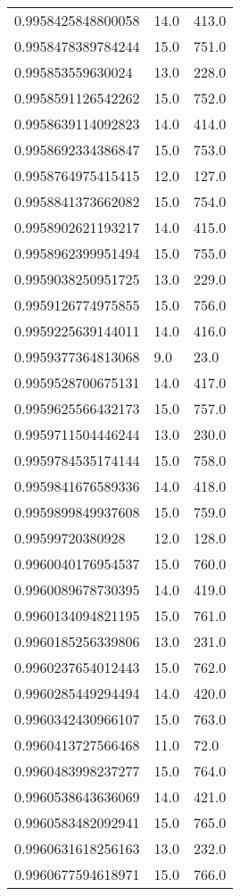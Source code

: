 \begin{center}
\begin{supertabular}[H]{p{0.30\textwidth}p{0.05\textwidth}p{0.05\textwidth}}
0.9958425848800058 & 14.0 & 413.0 \\ 
0.9958478389784244 & 15.0 & 751.0 \\ 
0.995853559630024 & 13.0 & 228.0 \\ 
0.9958591126542262 & 15.0 & 752.0 \\ 
0.9958639114092823 & 14.0 & 414.0 \\ 
0.9958692334386847 & 15.0 & 753.0 \\ 
0.9958764975415415 & 12.0 & 127.0 \\ 
0.9958841373662082 & 15.0 & 754.0 \\ 
0.9958902621193217 & 14.0 & 415.0 \\ 
0.9958962399951494 & 15.0 & 755.0 \\ 
0.9959038250951725 & 13.0 & 229.0 \\ 
0.9959126774975855 & 15.0 & 756.0 \\ 
0.9959225639144011 & 14.0 & 416.0 \\ 
0.9959377364813068 & 9.0 & 23.0 \\ 
0.9959528700675131 & 14.0 & 417.0 \\ 
0.9959625566432173 & 15.0 & 757.0 \\ 
0.9959711504446244 & 13.0 & 230.0 \\ 
0.9959784535174144 & 15.0 & 758.0 \\ 
0.9959841676589336 & 14.0 & 418.0 \\ 
0.9959899849937608 & 15.0 & 759.0 \\ 
0.99599720380928 & 12.0 & 128.0 \\ 
0.9960040176954537 & 15.0 & 760.0 \\ 
0.9960089678730395 & 14.0 & 419.0 \\ 
0.9960134094821195 & 15.0 & 761.0 \\ 
0.9960185256339806 & 13.0 & 231.0 \\ 
0.9960237654012443 & 15.0 & 762.0 \\ 
0.9960285449294494 & 14.0 & 420.0 \\ 
0.9960342430966107 & 15.0 & 763.0 \\ 
0.9960413727566468 & 11.0 & 72.0 \\ 
0.9960483998237277 & 15.0 & 764.0 \\ 
0.9960538643636069 & 14.0 & 421.0 \\ 
0.9960583482092941 & 15.0 & 765.0 \\ 
0.9960631618256163 & 13.0 & 232.0 \\ 
0.9960677594618971 & 15.0 & 766.0 \\ 

\end{supertabular}
\end{center}
